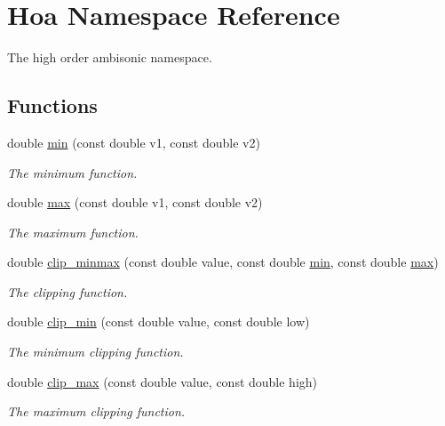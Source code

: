 \hypertarget{namespace_hoa}{\section{Hoa Namespace Reference}
\label{namespace_hoa}
}


The high order ambisonic namespace.  


\subsection*{Functions}
\begin{DoxyCompactItemize}
\item 
double \hyperlink{namespace_hoa_af938bba055dcde56bb2cd02e8eb1c4dc}{min} (const double v1, const double v2)
\begin{DoxyCompactList}\small\item\em The minimum function. \end{DoxyCompactList}\item 
double \hyperlink{namespace_hoa_a18a09e9aa0bc178190832f0b625f8630}{max} (const double v1, const double v2)
\begin{DoxyCompactList}\small\item\em The maximum function. \end{DoxyCompactList}\item 
double \hyperlink{namespace_hoa_a03b9d89f84b73d4bbe335ac186d0c222}{clip\-\_\-minmax} (const double value, const double \hyperlink{namespace_hoa_af938bba055dcde56bb2cd02e8eb1c4dc}{min}, const double \hyperlink{namespace_hoa_a18a09e9aa0bc178190832f0b625f8630}{max})
\begin{DoxyCompactList}\small\item\em The clipping function. \end{DoxyCompactList}\item 
double \hyperlink{namespace_hoa_a035f72d813d623708fc679234167652c}{clip\-\_\-min} (const double value, const double low)
\begin{DoxyCompactList}\small\item\em The minimum clipping function. \end{DoxyCompactList}\item 
double \hyperlink{namespace_hoa_a70a614a6370140a970f5e94afd244100}{clip\-\_\-max} (const double value, const double high)
\begin{DoxyCompactList}\small\item\em The maximum clipping function. \end{DoxyCompactList}\item 

\end{DoxyCompactItemize}
